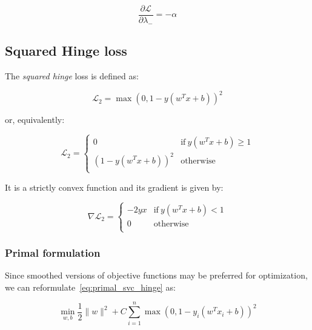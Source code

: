 \begin{equation} \label{eq:svc_bcqp_lagrangian_der_lm}
    \frac{\partial \mathcal{L}}{\partial \lambda_-}=-\alpha
\end{equation}

\pagebreak

\subsection{Squared Hinge loss}

The \emph{squared hinge} loss is defined as:

\begin{equation} \label{eq:squared_hinge_loss2}
	\mathcal{L}_2 = \max(0, 1 - y (w^T x + b))^2
\end{equation}

or, equivalently:

\begin{equation} \label{eq:squared_hinge_loss1}
	\mathcal{L}_2 = 
	\begin{cases}
		0 & \text{if} \ y (w^T x + b) \geq 1 \\
		(1 - y (w^T x + b))^2 & \text{otherwise} \\
	\end{cases}
\end{equation}

It is a strictly convex function and its gradient is given by:

\begin{equation} \label{eq:squared_hinge_loss_der}
    \nabla \mathcal{L}_2=
        \begin{cases}
            - 2 y x & \text{if} \ y (w^T x + b) < 1 \\
            0 & \text{otherwise} \\ 
        \end{cases}
\end{equation}

\subsubsection{Primal formulation}

Since smoothed versions of objective functions may be preferred for optimization, we can reformulate~\eqref{eq:primal_svc_hinge} as:

\begin{equation} \label{eq:primal_svc_squared_hinge}
    \min_{w,b} \frac{1}{2} \| w \|^2 + C \sum_{i=1}^n \max(0, 1 - y_i (w^T x_i + b))^2
\end{equation}

